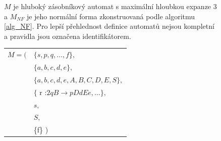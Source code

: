 \begin{figure}[ht]
\begin{Example} \label{example_NF}
$M$ je hluboký zásobníkový automat s maximální hloubkou expanze 3 a $M_{NF}$ je jeho normální forma zkonstruovaná podle algoritmu \ref{alg_NF}. Pro lepší přehlednost definice automatů nejsou kompletní a
pravidla jsou označena identifikátorem.
\medskip

\setlength{\deftabcolsep}{\tabcolsep}
\setlength{\tabcolsep}{1pt}

\begin{tabular}{ll}

$M = ($&$\{s,p,q, \dots, f\},$ \\
     &$\{a,b,c,d,e\}, $\\
     &$\{a,b,c,d,e,A,B,C,D,E,S\},$ \\
     &$\{$ r :\quad$ 2q B \rightarrow p DdEe, \dots\},$\\
     &$s,$ \\
     &$S,$ \\
     &\{f\} )
\end{tabular}

\bigskip

\begin{tabular}{llp{12cm}l}


\end{tabular}
\end{Example}
\end{figure}
